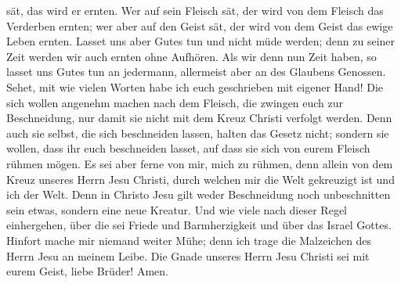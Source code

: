 sät, das wird er ernten.  Wer auf sein Fleisch sät, der wird
von dem Fleisch das Verderben ernten; wer aber auf den Geist sät, der
wird von dem Geist das ewige Leben ernten.  Lasset uns aber
Gutes tun und nicht müde werden; denn zu seiner Zeit werden wir auch
ernten ohne Aufhören.  Als wir denn nun Zeit haben, so
lasset uns Gutes tun an jedermann, allermeist aber an des Glaubens
Genossen.  Sehet, mit wie vielen Worten habe ich euch
geschrieben mit eigener Hand!  Die sich wollen angenehm
machen nach dem Fleisch, die zwingen euch zur Beschneidung, nur damit
sie nicht mit dem Kreuz Christi verfolgt werden.  Denn auch
sie selbst, die sich beschneiden lassen, halten das Gesetz nicht;
sondern sie wollen, dass ihr euch beschneiden lasset, auf dass sie sich
von eurem Fleisch rühmen mögen.  Es sei aber ferne von mir,
mich zu rühmen, denn allein von dem Kreuz unseres Herrn Jesu Christi,
durch welchen mir die Welt gekreuzigt ist und ich der Welt.
 Denn in Christo Jesu gilt weder Beschneidung noch
unbeschnitten sein etwas, sondern eine neue Kreatur.  Und
wie viele nach dieser Regel einhergehen, über die sei Friede und
Barmherzigkeit und über das Israel Gottes.  Hinfort mache
mir niemand weiter Mühe; denn ich trage die Malzeichen des Herrn Jesu an
meinem Leibe.  Die Gnade unseres Herrn Jesu Christi sei mit
eurem Geist, liebe Brüder! Amen.
